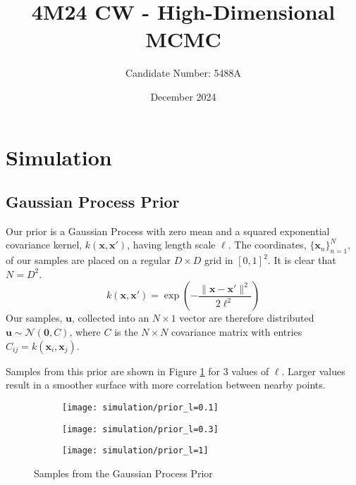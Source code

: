 \documentclass[11pt]{article}
\title{4M24 CW - High-Dimensional MCMC}
\author{Candidate Number: 5488A}
\date{December 2024}
\begin{document}

\setcounter{page}{1}

\maketitle

\section{Simulation}
\subsection{Gaussian Process Prior}
Our prior is a Gaussian Process with zero mean and a squared exponential covariance kernel, $k(\boldsymbol{x}, \boldsymbol{x}')$, having length scale $\ell$. The coordinates, $\{\boldsymbol{x}_n\}_{n=1}^{N}$, of our samples are placed on a regular $D \times D$ grid in $[0, 1]^2$. It is clear that $N = D^2$.
\begin{equation}
    k(\boldsymbol{x}, \boldsymbol{x}') = \exp\left(-\frac{\|\boldsymbol{x} - \boldsymbol{x}'\|^2}{2\ell^2}\right)
\end{equation}
Our samples, $\boldsymbol{u}$, collected into an $N \times 1$ vector are therefore distributed $\boldsymbol{u} \sim \mathcal{N}(\boldsymbol{0}, C)$, where $C$ is the $N \times N$ covariance matrix with entries $C_{ij} = k(\boldsymbol{x}_i, \boldsymbol{x}_j)$.

Samples from this prior are shown in Figure \ref{fig:gp_prior} for 3 values of $\ell$. Larger values result in a smoother surface with more correlation between nearby points.

\begin{figure}
    \centering
    \begin{subfigure}{0.3\textwidth}
        \texttt{[image: simulation/prior\_l=0.1]}
    \end{subfigure}
    \begin{subfigure}{0.3\textwidth}
        \texttt{[image: simulation/prior\_l=0.3]}
    \end{subfigure}
    \begin{subfigure}{0.3\textwidth}
        \texttt{[image: simulation/prior\_l=1]}
    \end{subfigure}
    \caption{Samples from the Gaussian Process Prior}
    \label{fig:gp_prior}
\end{figure}
\end{document}
